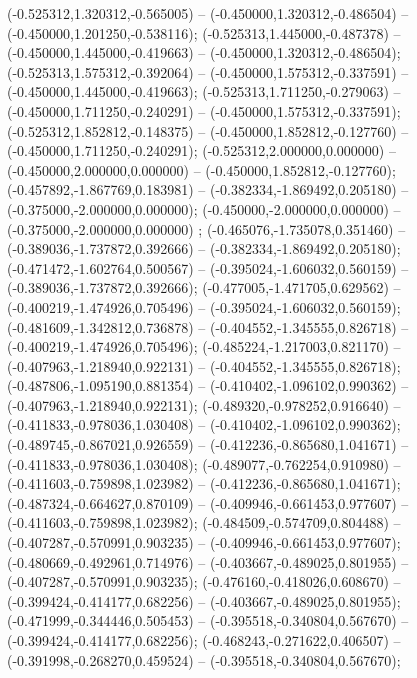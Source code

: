  (-0.525312,1.320312,-0.565005) -- (-0.450000,1.320312,-0.486504) -- (-0.450000,1.201250,-0.538116);
 (-0.525313,1.445000,-0.487378) -- (-0.450000,1.445000,-0.419663) -- (-0.450000,1.320312,-0.486504);
 (-0.525313,1.575312,-0.392064) -- (-0.450000,1.575312,-0.337591) -- (-0.450000,1.445000,-0.419663);
 (-0.525313,1.711250,-0.279063) -- (-0.450000,1.711250,-0.240291) -- (-0.450000,1.575312,-0.337591);
 (-0.525312,1.852812,-0.148375) -- (-0.450000,1.852812,-0.127760) -- (-0.450000,1.711250,-0.240291);
 (-0.525312,2.000000,0.000000) -- (-0.450000,2.000000,0.000000) -- (-0.450000,1.852812,-0.127760);
 (-0.457892,-1.867769,0.183981) -- (-0.382334,-1.869492,0.205180) -- (-0.375000,-2.000000,0.000000);
 (-0.450000,-2.000000,0.000000) -- (-0.375000,-2.000000,0.000000) ;
 (-0.465076,-1.735078,0.351460) -- (-0.389036,-1.737872,0.392666) -- (-0.382334,-1.869492,0.205180);
 (-0.471472,-1.602764,0.500567) -- (-0.395024,-1.606032,0.560159) -- (-0.389036,-1.737872,0.392666);
 (-0.477005,-1.471705,0.629562) -- (-0.400219,-1.474926,0.705496) -- (-0.395024,-1.606032,0.560159);
 (-0.481609,-1.342812,0.736878) -- (-0.404552,-1.345555,0.826718) -- (-0.400219,-1.474926,0.705496);
 (-0.485224,-1.217003,0.821170) -- (-0.407963,-1.218940,0.922131) -- (-0.404552,-1.345555,0.826718);
 (-0.487806,-1.095190,0.881354) -- (-0.410402,-1.096102,0.990362) -- (-0.407963,-1.218940,0.922131);
 (-0.489320,-0.978252,0.916640) -- (-0.411833,-0.978036,1.030408) -- (-0.410402,-1.096102,0.990362);
 (-0.489745,-0.867021,0.926559) -- (-0.412236,-0.865680,1.041671) -- (-0.411833,-0.978036,1.030408);
 (-0.489077,-0.762254,0.910980) -- (-0.411603,-0.759898,1.023982) -- (-0.412236,-0.865680,1.041671);
 (-0.487324,-0.664627,0.870109) -- (-0.409946,-0.661453,0.977607) -- (-0.411603,-0.759898,1.023982);
 (-0.484509,-0.574709,0.804488) -- (-0.407287,-0.570991,0.903235) -- (-0.409946,-0.661453,0.977607);
 (-0.480669,-0.492961,0.714976) -- (-0.403667,-0.489025,0.801955) -- (-0.407287,-0.570991,0.903235);
 (-0.476160,-0.418026,0.608670) -- (-0.399424,-0.414177,0.682256) -- (-0.403667,-0.489025,0.801955);
 (-0.471999,-0.344446,0.505453) -- (-0.395518,-0.340804,0.567670) -- (-0.399424,-0.414177,0.682256);
 (-0.468243,-0.271622,0.406507) -- (-0.391998,-0.268270,0.459524) -- (-0.395518,-0.340804,0.567670);
